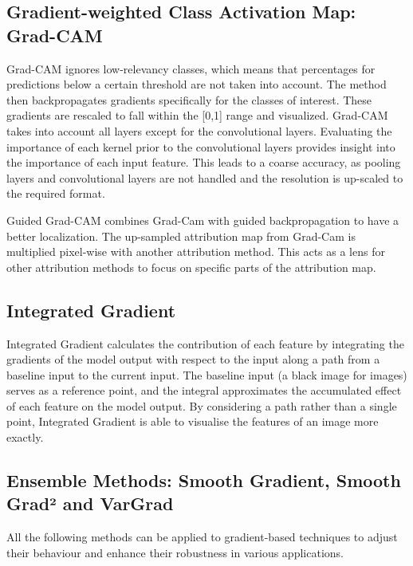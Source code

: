 \subsection{Gradient-weighted Class Activation Map: Grad-CAM}

Grad-CAM \cite{gradcam} ignores low-relevancy classes, which means that percentages for predictions below a certain threshold are not taken into account. The method then backpropagates gradients specifically for the classes of interest. These gradients are rescaled to fall within the [0,1] range and visualized. Grad-CAM takes into account all layers except for the convolutional layers. Evaluating the importance of each kernel prior to the convolutional layers provides insight into the importance of each input feature. This leads to a coarse accuracy, as pooling layers and convolutional layers are not handled and the resolution is up-scaled to the required format.

Guided Grad-CAM \cite{gradcam} combines Grad-Cam with guided backpropagation \cite{springenberg2015striving} to have a better localization. The up-sampled attribution map from Grad-Cam is multiplied pixel-wise with another attribution method. This acts as a lens for other attribution methods to focus on specific parts of the attribution map.

\subsection{Integrated Gradient}
\label{IG}

Integrated Gradient \cite{sundararajan2017axiomatic} calculates the contribution of each feature by integrating the gradients of the model output with respect to the input along a path from a baseline input to the current input. The baseline input (a black image for images) serves as a reference point, and the integral approximates the accumulated effect of each feature on the model output. By considering a path rather than a single point, Integrated Gradient is able to visualise the features of an image more exactly.


\subsection{Ensemble Methods: Smooth Gradient, Smooth Grad² and VarGrad}

All the following methods can be applied to gradient-based techniques to adjust their behaviour and enhance their robustness in various applications.

